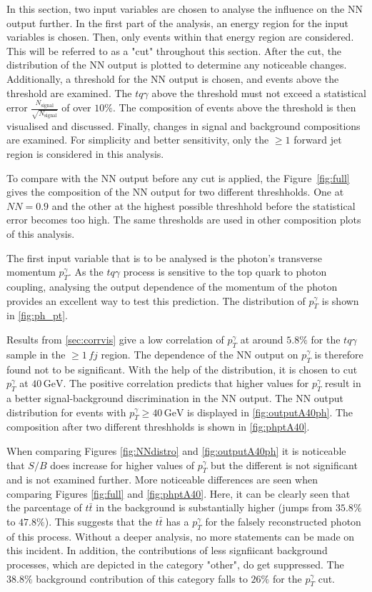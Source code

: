 In this section, two input variables are chosen to analyse the influence on the NN output further. In the first part of the analysis, an energy region for the input variables is chosen. Then, only events within that energy region are considered. This will be referred to as a "cut" throughout this section. 
After the cut, the distribution of the NN output is plotted to determine any noticeable changes. Additionally, a threshold for the NN output is chosen, and events above the threshold are examined. The $tq\gamma$ above the threshold must not exceed a statistical error $\frac{N_\text{signal}}{\sqrt{N_\text{signal}}}$ of over $10\%$. 
The composition of events above the threshold is then visualised and discussed. Finally, changes in signal and background compositions are examined. For simplicity and better sensitivity, only the $\geq 1$ forward jet region is considered in this analysis.

To compare with the NN output before any cut is applied, the Figure~\ref{fig:full} gives the composition of the NN output for two different threshholds. One at $NN = 0.9$ and the other at the highest possible threshhold before the statistical error becomes too high. The same thresholds are used in other composition plots of this analysis. 

The first input variable that is to be analysed is the photon's transverse momentum $p_T^\gamma$. As the $tq\gamma$ process is sensitive to the top quark to photon coupling, analysing the output dependence of the momentum of the photon provides an excellent way to test this prediction. 
The distribution of $p_T^\gamma$ is shown in \autoref{fig:ph_pt}. 

Results from \autoref{sec:corrvis} give a low correlation of $p_T^\gamma$ at around $5.8\%$ for the $tq\gamma$ sample in the $\geq 1\, fj$ region. The dependence of the NN output on $p_T^\gamma$ is therefore found not to be significant. 
With the help of the distribution, it is chosen to cut $p_T^\gamma$ at $40\,\si{\giga\electronvolt}$. The positive correlation predicts that higher values for $p_T^\gamma$ result in a better signal-background discrimination in the NN output. 
The NN output distribution for events with $p_T^\gamma \geq 40\,\si{\giga\electronvolt}$ is displayed in \autoref{fig:outputA40ph}. The composition after two different threshholds is shown in \autoref{fig:phptA40}.

When comparing Figures \ref{fig:NNdistro} and \ref{fig:outputA40ph} it is noticeable that $S/B$ does increase for higher values of $p_T^\gamma$ but the different is not significant and is not examined further. 
More noticeable differences are seen when comparing Figures \ref{fig:full} and \ref{fig:phptA40}. Here, it can be clearly seen that the parcentage of $t\bar{t}$ in the background is substantially higher (jumps from $35.8\%$ to $47.8\%$). 
This suggests that the $t\bar{t}$ has a $p_T^\gamma$ for the falsely reconstructed photon of this process. Without a deeper analysis, no more statements can be made on this incident. 
In addition, the contributions of less signfiicant background processes, which are depicted in the category "other", do get suppressed. The $38.8\%$ background contribution of this category falls to $26\%$ for the $p_T^\gamma$ cut.

